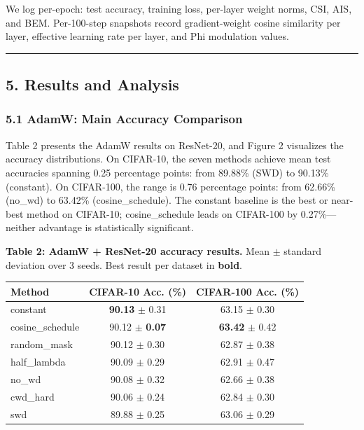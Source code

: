 \documentclass[
]{article}
\begin{document}
We log per-epoch: test accuracy, training loss, per-layer weight norms,
CSI, AIS, and BEM. Per-100-step snapshots record gradient-weight cosine
similarity per layer, effective learning rate per layer, and Phi
modulation values.

\begin{center}\rule{0.5\linewidth}{0.5pt}\end{center}

\hypertarget{results-and-analysis}{%
\subsection{5. Results and Analysis}\label{results-and-analysis}}

\hypertarget{adamw-main-accuracy-comparison}{%
\subsubsection{5.1 AdamW: Main Accuracy
Comparison}\label{adamw-main-accuracy-comparison}}

Table 2 presents the AdamW results on ResNet-20, and Figure 2 visualizes
the accuracy distributions. On CIFAR-10, the seven methods achieve mean
test accuracies spanning 0.25 percentage points: from 89.88\% (SWD) to
90.13\% (constant). On CIFAR-100, the range is 0.76 percentage points:
from 62.66\% (no\_wd) to 63.42\% (cosine\_schedule). The constant
baseline is the best or near-best method on CIFAR-10; cosine\_schedule
leads on CIFAR-100 by 0.27\%---neither advantage is statistically
significant.

\textbf{Table 2: AdamW + ResNet-20 accuracy results.} Mean \(\pm\)
standard deviation over 3 seeds. Best result per dataset in
\textbf{bold}.

\begin{longtable}[]{@{}lcc@{}}
\toprule\noalign{}
Method & CIFAR-10 Acc. (\%) & CIFAR-100 Acc. (\%) \\
\midrule\noalign{}
\endhead
\bottomrule\noalign{}
\endlastfoot
constant & \textbf{90.13} \(\pm\) 0.31 & 63.15 \(\pm\) 0.30 \\
cosine\_schedule & 90.12 \(\pm\) \textbf{0.07} & \textbf{63.42} \(\pm\)
0.42 \\
random\_mask & 90.12 \(\pm\) 0.30 & 62.87 \(\pm\) 0.38 \\
half\_lambda & 90.09 \(\pm\) 0.29 & 62.91 \(\pm\) 0.47 \\
no\_wd & 90.08 \(\pm\) 0.32 & 62.66 \(\pm\) 0.38 \\
cwd\_hard & 90.06 \(\pm\) 0.24 & 62.84 \(\pm\) 0.30 \\
swd & 89.88 \(\pm\) 0.25 & 63.06 \(\pm\) 0.29 \\
\end{longtable}
\end{document}
